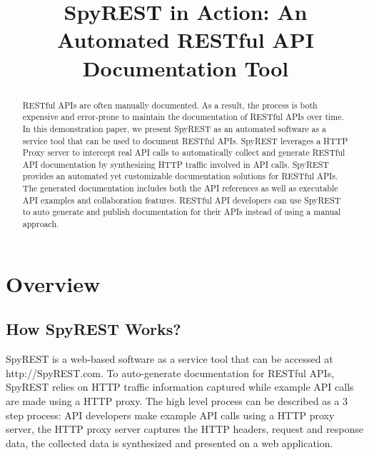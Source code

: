 \documentclass[conference]{IEEEtran}
\begin{document}
\title{SpyREST in Action: An Automated RESTful API Documentation Tool}

\author{
}
\maketitle


\begin{abstract}
RESTful APIs are often manually documented. As a result, the process is both expensive and error-prone to maintain the documentation of RESTful APIs over time. In this demonstration paper, we present SpyREST as an automated software as a service tool that can be used to document RESTful APIs. SpyREST leverages a HTTP Proxy server to intercept real API calls to automatically collect and generate RESTful API documentation by synthesizing HTTP traffic involved in API calls. SpyREST provides an automated yet customizable documentation solutions for RESTful APIs. The generated documentation includes both the API references as well as executable API examples and collaboration features. RESTful API developers can use SpyREST to auto generate and publish documentation for their APIs instead of using a manual approach.

\end{abstract}

\IEEEpeerreviewmaketitle

\section{Overview}

\subsection{How SpyREST Works?} %
\label{sub:how_it_works}

SpyREST is a web-based software as a service tool that can be accessed at http://SpyREST.com. To auto-generate documentation for RESTful APIs, SpyREST relies on HTTP traffic information captured while example API calls are made using a HTTP proxy. The high level process can be described as a 3 step process: API developers make example API calls using a HTTP proxy server, the HTTP proxy server captures the HTTP headers, request and response data, the collected data is synthesized and presented on a web application.
\end{document}
